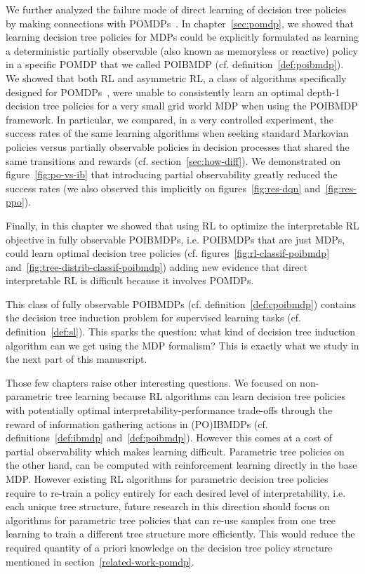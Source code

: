 We further analyzed the failure mode of direct learning of decision tree policies by making connections with POMDPs~\cite{POMDP,chap2}.
In chapter~\ref{sec:pomdp}, we showed that learning decision tree policies for MDPs could be explicitly formulated as learning a deterministic partially observable (also known as memoryless or reactive) policy in a specific POMDP that we called POIBMDP (cf. definition~\ref{def:poibmdp}).
We showed that both RL and asymmetric RL, a class of algorithms specifically designed for POMDPs~\cite{baisero-ppo,baisero-dqn}, were unable to consistently learn an optimal depth-1 decision tree policies for a very small grid world MDP when using the POIBMDP framework.
In particular, we compared, in a very controlled experiment, the success rates of the same learning algorithms when seeking standard Markovian policies versus partially observable policies in decision processes that shared the same transitions and rewards (cf. section~\ref{sec:how-diff}).
We demonstrated on figure~\ref{fig:po-vs-ib} that introducing partial observability greatly reduced the success rates (we also observed this implicitly on figures~\ref{fig:res-dqn} and~\ref{fig:res-ppo}).  

Finally, in this chapter we showed that using RL to optimize the interpretable RL objective in fully observable POIBMDPs, i.e. POIBMDPs that are just MDPs, could learn optimal decision tree policies (cf. figures~\ref{fig:rl-classif-poibmdp} and~\ref{fig:tree-distrib-classif-poibmdp}) adding new evidence that direct interpretable RL is difficult because it involves POMDPs.

This class of fully observable POIBMDPs (cf. definition~\ref{def:cpoibmdp}) contains the decision tree induction problem for supervised learning tasks (cf. definition~\ref{def:sl}).
This sparks the question: what kind of decision tree induction algorithm can we get using the MDP formalism?
This is exactly what we study in the next part of this manuscript.

Those few chapters raise other interesting questions.
We focused on non-parametric tree learning because RL algorithms can learn decision tree policies with potentially optimal interpretability-performance trade-offs through the reward of information gathering actions in (PO)IBMDPs (cf. definitions~\ref{def:ibmdp} and~\ref{def:poibmdp}).
However this comes at a cost of partial observability which makes learning difficult. 
Parametric tree policies on the other hand, can be computed with reinforcement learning directly in the base MDP.
However existing RL algorithms for parametric decision tree policies~\cite{silva,vos2024optimizinginterpretabledecisiontree,sympol} require to re-train a policy entirely for each desired level of interpretability, i.e. each unique tree structure, future research in this direction should focus on algorithms for parametric tree policies that can re-use samples from one tree learning to train a different tree structure more efficiently.
This would reduce the required quantity of a priori knowledge on the decision tree policy structure mentioned in section~\ref{related-work-pomdp}.


